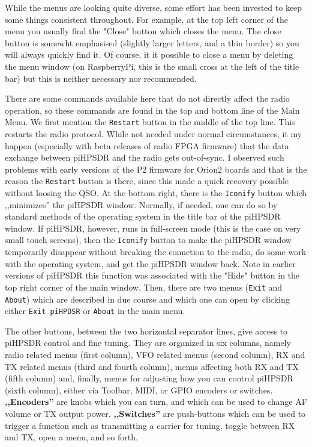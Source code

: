 \documentclass[12pt]{book}
\def\rett#1{\texttt{\color{red}#1}}
\def\bltt#1{\texttt{\color{blue}#1}}
\begin{document}
While the menus are looking quite diverse, some effort has been invested to keep
some things consistent throughout. For example, at the top left corner of the menu
you usually find the "Close" button which closes the menu. The close button is somewht
emphasised (slightly larger letters, and a thin border) so you will always quickly find it.
Of course, it it possible to close a menu by deleting the menu window (on RaspberryPi,
this is the small cross at the left of the title bar) but this is neither necessary nor
recommended.

There are some commands available here that do not directly affect the radio operation,
so these commands are found in the top and bottom line of the Main Menu. We first 
mention the \rett{Restart} button in the middle of the top line. This restarts the
radio protocol. While not needed under normal circumstances, it my happen (especially
with beta releases of radio FPGA firmware) that the data exchange between piHPSDR and
the radio gets out-of-sync. I observed such problems with early versions of the P2
firmware for Orion2 boards and that is the reason the \rett{Restart} button is
there, since this made a quick recovery possible without loosing the QSO.
At the bottom right, there is the \rett{Iconify} button which ,,minimizes'' the
piHPSDR window. Normally, if needed, one can do so by standard methods of the
operating system in the title bar of the piHPSDR window. If piHPSDR, however,
runs in full-screen mode (this is the case on very small touch screens), then the
\rett{Iconify} button to make the piHPSDR window temporarily disappear without
breaking the connetion to the radio, do some work with the operating system, and
get the piHPSDR window back. Note in earlier versions of piHPSDR this function was
associated with the "Hide" button in the top right corner of the main window.
Then, there are two menus (\bltt{Exit} and \bltt{About}) which are described in due course and which
one can open by clicking either \rett{Exit piHPDSR} or \rett{About} in the main menu.

The other buttons, between the two horizontal separator lines, give access to piHPSDR
control and fine tuning. They are organized in six columns, namely radio related
menus (first column), VFO related menus (second column), RX and TX related menus (third
and fourth column), menus affecting both RX and TX (fifth column) and, finally,
menus for adjusting how you can control piHPSDR (sixth column), either via Toolbar,
MIDI, or GPIO encoders or switches. \textbf{,,Encoders''} are knobs which you can turn, and which
can be used to change AF volume or TX output power. \textbf{,,Switches''} are push-buttons which
can be used to trigger a function such as transmitting a carrier for tuning, toggle
between RX and TX, open a menu, and so forth.
\end{document}

